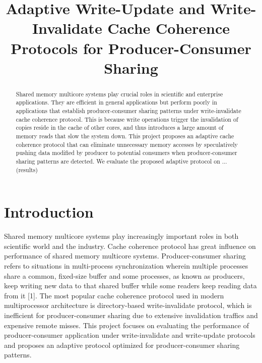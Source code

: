 \documentclass[conference]{IEEEtran}
\begin{document}
%
\title{Adaptive Write-Update and Write-Invalidate Cache Coherence Protocols for Producer-Consumer Sharing}


\author{
\and
{}
}

\maketitle


\begin{abstract}
Shared memory multicore systems play crucial roles in scientific and enterprise applications. They are efficient in general applications but perform poorly in applications that establish producer-consumer sharing patterns under write-invalidate cache coherence protocol. This is because write operations trigger the invalidation of copies reside in the cache of other cores, and thus introduces a large amount of memory reads that slow the system down. This project proposes an adaptive cache coherence protocol that can eliminate unnecessary memory accesses by speculatively pushing data modified by producer to potential consumers when producer-consumer sharing patterns are detected. We evaluate the proposed adaptive protocol on ... (results)
\end{abstract}


\section{Introduction}
Shared memory multicore systems play increasingly important roles in both scientific world and the industry. Cache coherence protocol has great influence on performance of shared memory multicore systems. Producer-consumer sharing refers to situations in multi-process synchronization wherein multiple processes share a common, fixed-size buffer and some processes, as known as producers, keep writing new data to that shared buffer while some readers keep reading data from it [1]. The most popular cache coherence protocol used in modern multiprocessor architecture is directory-based write-invalidate protocol, which is inefficient for producer-consumer sharing due to extensive invalidation traffics and expensive remote misses. This project focuses on evaluating the performance of producer-consumer application under write-invalidate and write-update protocols and proposes an adaptive protocol optimized for producer-consumer sharing patterns.
\end{document}
